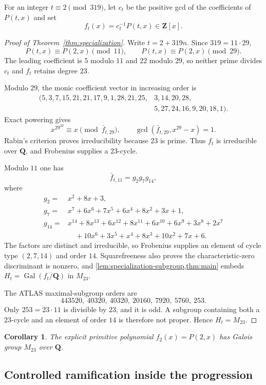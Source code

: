 \documentclass[11pt]{amsart}
\newtheorem{corollary}[corollary]{Corollary}
\theoremstyle{definition}
\theoremstyle{remark}
\newcommand{\QQ}{\mathbf Q}
\newcommand{\ZZ}{\mathbf Z}
\newcommand{\Gal}{\operatorname{Gal}}
\begin{document}
For an integer $t\equiv2\pmod{319}$, let $c_t$ be the positive gcd of the
coefficients of $P(t,x)$ and set
\[
 f_t(x)=c_t^{-1}P(t,x)\in\ZZ[x].
\]

\begin{proof}[Proof of Theorem~\ref{thm:specialization}]
Write $t=2+319n$.  Since $319=11\cdot29$,
\[
 P(t,x)\equiv P(2,x)\pmod{11},\qquad
 P(t,x)\equiv P(2,x)\pmod{29}.
\]
The leading coefficient is $5$ modulo $11$ and $22$ modulo $29$, so neither
prime divides $c_t$ and $f_t$ retains degree $23$.

Modulo $29$, the monic coefficient vector in increasing order is
\[
\begin{split}
(5,3,7,15,21,21,17,9,1,28,21,25,{}&3,14,20,28,\\
 &5,27,24,16,9,20,18,1).
\end{split}
\]
Exact powering gives
\[
 x^{29^{23}}\equiv x\pmod{\bar f_{t,29}},\qquad
 \gcd(\bar f_{t,29},x^{29}-x)=1.
\]
Rabin's criterion proves irreducibility because $23$ is prime.  Thus $f_t$
is irreducible over $\QQ$, and Frobenius supplies a $23$-cycle.

Modulo $11$ one has
\[
 \bar f_{t,11}=g_2g_7g_{14},
\]
where
\begin{align*}
g_2={}&x^2+8x+3,\\
g_7={}&x^7+6x^6+7x^5+6x^4+8x^2+3x+1,\\
g_{14}={}&x^{14}+8x^{13}+6x^{12}+8x^{11}+6x^{10}+6x^9
 +3x^8+2x^7\\
&\quad+10x^6+3x^5+x^4+8x^3+10x^2+7x+6.
\end{align*}
The factors are distinct and irreducible, so Frobenius supplies an element
of cycle type $(2,7,14)$ and order $14$.  Squarefreeness also proves the
characteristic-zero discriminant is nonzero, and
\cref{lem:specialization-subgroup,thm:main} embeds
$H_t=\Gal(f_t/\QQ)$ in $M_{23}$.

The ATLAS maximal-subgroup orders are \cite{ATLAS,ATLASM23}
\[
 443520,\ 40320,\ 40320,\ 20160,\ 7920,\ 5760,\ 253.
\]
Only $253=23\cdot11$ is divisible by $23$, and it is odd.  A subgroup
containing both a $23$-cycle and an element of order $14$ is therefore not
proper.  Hence $H_t=M_{23}$.
\end{proof}

\begin{corollary}\label{cor:explicit}
The explicit primitive polynomial $f_2(x)=P(2,x)$ has Galois group $M_{23}$
over $\QQ$.
\end{corollary}

\subsection{Controlled ramification inside the progression}
\end{document}
